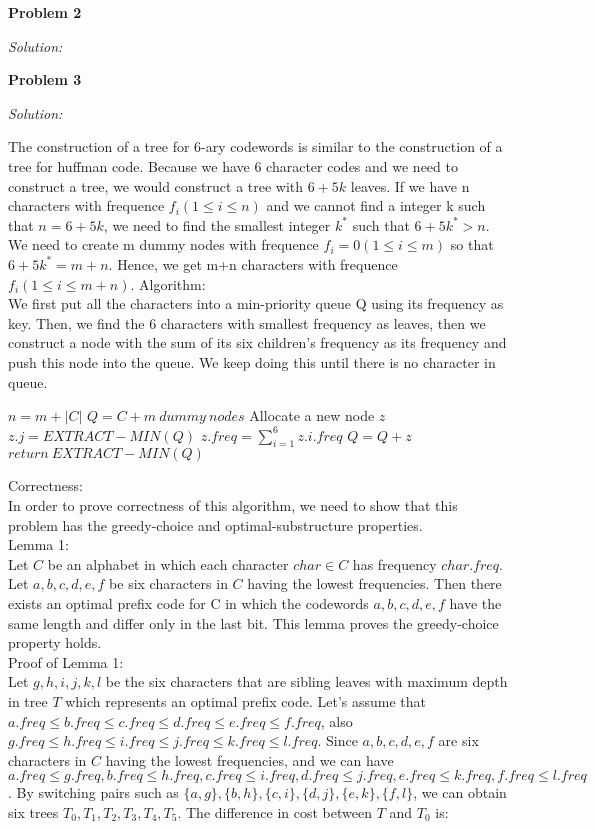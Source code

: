 \documentclass[12pt,letterpaper]{article}
\def\pp{\par\noindent}
\newcommand{\problem}[1]{ \bigskip \pp \textbf{Problem #1}\par}
\newcommand{\solution}{\textit{Solution:}\par}
\begin{document}
\problem{2}
\solution

\problem{3}
\solution
The construction of a tree for 6-ary codewords is similar to the construction of a tree for huffman code. Because we have 6 character codes and we need to construct a tree, we would construct a tree with $6 + 5k$ leaves. If we have n characters with frequence $f_i (1 \le i \le n)$ and we cannot find a integer k such that $n = 6+5k$, we need to find the smallest integer $k^*$ such that $6+5k^* > n$. We need to create m dummy nodes with frequence $f_i = 0 (1 \le i \le m)$ so that $6+5k^* = m+n$. Hence, we get m+n characters with frequence $f_i (1 \le i \le m+n)$.
Algorithm: \\
We first put all the characters into a min-priority queue Q using its frequency as key. Then, we find the 6 characters with smallest frequency as leaves, then we construct a node with the sum of its six children's frequency as its frequency and push this node into the queue. We keep doing this until there is no character in queue. \\
\begin{algorithm}[H]
$n = m+|C|$ \;
$Q = C + m\ dummy\ nodes$ \;
{
Allocate a new node $z$ \;
  {
$z.j = EXTRACT-MIN(Q)$ \; 
 }
 $z.freq = \sum _{i=1} ^{6} z.i.freq$ \;
 $Q = Q + z$ \;
}
   $return\  EXTRACT-MIN(Q)$ \;
\end{algorithm}
Correctness: \\
In order to prove correctness of this algorithm, we need to show that this problem has the greedy-choice and optimal-substructure properties. \\
Lemma 1: \\
Let $C$ be an alphabet in which each character $char \in C$ has frequency $char.freq$. Let $a,b,c,d,e,f$ be six characters in $C$ having the lowest frequencies. Then there exists an optimal prefix code for C in which the codewords $a,b,c,d,e,f$ have the same length and differ only in the last bit. This lemma proves the greedy-choice property holds. \\
Proof of Lemma 1: \\
Let $g,h,i,j,k,l$ be the six characters that are sibling leaves with maximum depth in tree $T$ which represents an optimal prefix code. Let's assume that $a.freq \le b.freq \le c.freq \le d.freq \le e.freq \le f.freq$, also $g.freq \le h.freq \le i.freq \le j.freq \le k.freq \le l.freq$. Since $a,b,c,d,e,f$ are six characters in $C$ having the lowest frequencies, and we can have $a.freq \le g.freq, b.freq \le h.freq, c.freq \le i.freq, d.freq \le j.freq, e.freq \le k.freq, f.freq \le l.freq$. By switching pairs such as $\{a,g\}, \{b,h\}, \{c,i\}, \{d,j\}, \{e,k\}, \{f,l\}$, we can obtain six trees $T_0, T_1, T_2, T_3, T_4, T_5$. The difference in cost between $T$ and $T_0$ is: \\
\end{document}
